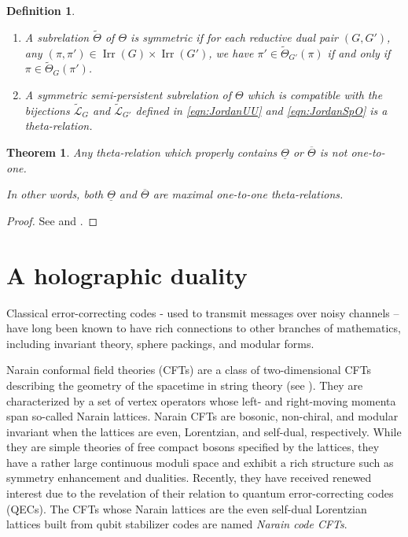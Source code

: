 \documentclass[12pt]{amsart}
\numberwithin{equation}{subsection}
\newtheorem{defn}[equation]{Definition}
\newtheorem{thm}[equation]{Theorem}
\newcommand{\cL}{\mathcal{L}}
\newcommand{\tcL}{{\widetilde{\cL}}}
\newcommand{\Irr}{\operatorname{Irr}}
\begin{document}
\begin{defn} \

{\rm 
\begin{enumerate}
\item 
A subrelation $\widetilde{\Theta}$ of $\Theta$ is \textit{symmetric} if for each reductive dual pair $(G,G')$, any $(\pi,\pi')\in\Irr(G)\times\Irr(G')$,
we have $\pi'\in \widetilde\Theta_{G'}(\pi)$ if and only if $\pi\in \widetilde\Theta_{G}(\pi')$.
\item
A symmetric semi-persistent subrelation of $\Theta$ which is compatible with the bijections $\tcL_G$ and $\tcL_{G'}$ defined in \eqref{eqn:JordanUU} and \eqref{eqn:JordanSpO} is a \textit{theta-relation}.
\end{enumerate}
}
\end{defn}

\begin{thm}
Any theta-relation which properly contains $\underline\Theta$ or $\overline\Theta$ is not one-to-one. 

In other words, both $\underline\Theta$ and $\overline\Theta$ are maximal one-to-one theta-relations.
\end{thm}
\begin{proof}
See \cite[Corollary~7.3]{Pan-eta-SpO} and \cite[Proposition~4.7]{PanUU}.
\end{proof}


\section{A holographic duality} \label{sec:holo}
Classical error-correcting codes - used to transmit messages over noisy channels – have long been known to have rich connections to other branches of mathematics, including invariant theory, sphere packings, and modular forms.

Narain conformal field theories (CFTs) are a class of two-dimensional CFTs describing the geometry of the spacetime in string theory (see \cite{Narain1, Narain2}). They are characterized by a set of vertex operators whose left- and right-moving momenta span so-called Narain lattices. Narain CFTs are bosonic, non-chiral, and modular invariant when the lattices are even, Lorentzian, and self-dual, respectively. While they are simple theories of free compact bosons specified by the
lattices, they have a rather large continuous moduli space and exhibit a rich structure such as symmetry enhancement and dualities. Recently, they have received renewed interest  due to the revelation of their relation to quantum error-correcting codes (QECs). The CFTs whose Narain lattices are the even self-dual Lorentzian lattices built from qubit stabilizer codes are named \textit{Narain code CFTs}.
\end{document}
